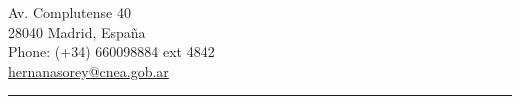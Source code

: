 \begin{minipage}[t]{0.40\textwidth}
	Av. Complutense 40\\
	28040 Madrid, España\\
	Phone: (+34) 660098884 ext 4842\\
	\href{mailto:hernanasorey@cnea.gob.ar}{hernanasorey@cnea.gob.ar}\\
\end{minipage}
\fi

\hrule

% 
% 
% 
